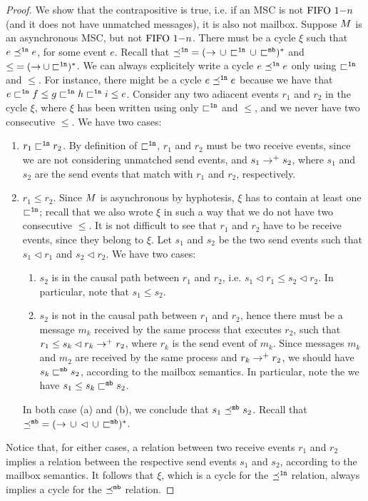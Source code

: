 \mbonennounmatched*
\begin{proof}
	We show that the contrapositive is true, i.e. if an MSC is not $\text{FIFO } 1\mathsf{-}n$ (and it does not have unmatched messages), it is also not mailbox. Suppose $M$ is an asynchronous MSC, but not $\text{FIFO } 1\mathsf{-}n$. There must be a cycle $\xi$ such that  $e \preceq^{\mathtt{1n}} e$, for some event $e$. Recall that ${\preceq^{\mathtt{1n}}} = ({\to} \,\cup\, {\sqsubset^{\mathtt{1n}}} \,\cup\, {\sqsubset^{\mathtt{mb}}})^\ast$ and ${\le} = ({\to} \cup {\sqsubset^{\ensuremath{\mathtt{1n}}}})^\ast$. We can always explicitely write a cycle $e \preceq^{\mathtt{1n}} e$ only using $\sqsubset^{\mathtt{1n}}$ and $\le$. For instance, there might be a cycle $e \preceq^{\mathtt{1n}} e$ because we have that $e \sqsubset^{\mathtt{1n}} f \le g \sqsubset^{\mathtt{1n}} h \sqsubset^{\mathtt{1n}} i \le e$. Consider any two adiacent events $r_1$ and $r_2$ in the cycle $\xi$, where $\xi$ has been written using only $\sqsubset^{\mathtt{1n}}$ and $\le$, and we never have two consecutive $\le$. We have two cases:
	\begin{enumerate}
		\item $r_1 \sqsubset^{\mathtt{1n}} r_2$. By definition of $\sqsubset^{\mathtt{1n}}$, $r_1$ and $r_2$ must be two receive events, since we are not considering unmatched send events, and $s_1 \to^+ s_2$, where $s_1$ and $s_2$ are the send events that match with $r_1$ and $r_2$, respectively.
		\item $r_1 \le r_2$. Since $M$ is asynchronous by hyphotesis, $\xi$ has to contain at least one $\sqsubset^{\mathtt{1n}}$; recall that we also wrote $\xi$ in such a way that we do not have two consecutive $\le$. It is not difficult to see that $r_1$ and $r_2$ have to be receive events, since they belong to $\xi$. Let $s_1$ and $s_2$ be the two send events such that $s_1 \lhd r_1$ and $s_2 \lhd r_2$. We have two cases:
		\begin{enumerate}
			\item $s_2$ is in the causal path between $r_1$ and $r_2$, i.e. $s_1 \lhd r_1 \le s_2 \lhd r_2$. In particular, note that $s_1 \le s_2$.
			\item $s_2$ is not in the causal path between $r_1$ and $r_2$, hence there must be a message $m_k$ received by the same process that executes $r_2$, such that $r_1 \le s_k \lhd r_k \to^+ r_2$, where $r_k$ is the send event of $m_k$. Since messages $m_k$ and $m_2$ are received by the same process and $r_k \to^+ r_2$, we should have $s_k \sqsubset^{\mathtt{mb}} s_2$, according to the mailbox semantics. In particular, note the we have $s_1 \le s_k \sqsubset^{\mathtt{mb}} s_2$.
		\end{enumerate}
		In both case (a) and (b), we conclude that $s_1 \preceq^{\mathtt{mb}} s_2$. Recall that ${\preceq^{\mathtt{mb}}} = ({\to} \,\cup\, {\lhd} \,\cup\, {\sqsubset^{\mathtt{mb}}})^\ast$.
	\end{enumerate}
	Notice that, for either cases, a relation between two receive events $r_1$ and $r_2$ implies a relation between the respective send events $s_1$ and $s_2$, according to the mailbox semantics. It follows that $\xi$, which is a cycle for the $\preceq^{\mathtt{1n}}$ relation, always implies a cycle for the $\preceq^{\mathtt{mb}}$ relation.
	\end{proof}

